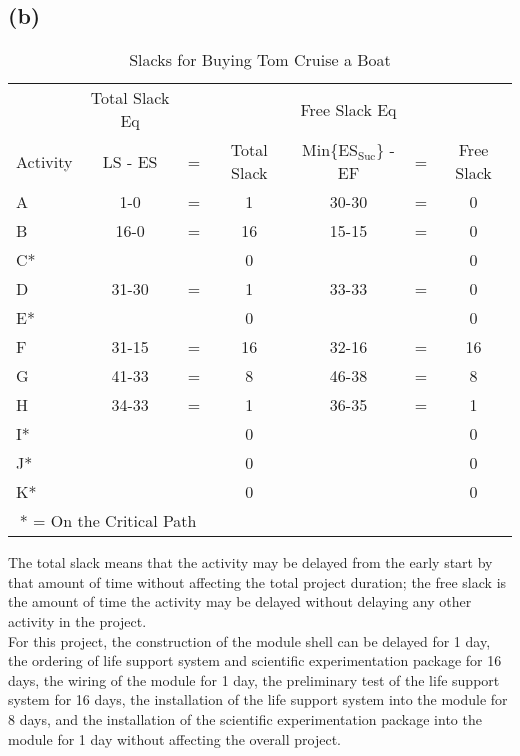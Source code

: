 \documentclass{article}
\begin{document}
	\subsection*{(b)}
		{\renewcommand{\arraystretch}{1.2} 
	\begin{table}[h!tbp]
  		\begin{center}
    		\caption{Slacks for Buying Tom Cruise a Boat}
    		\label{tab:table2}
			
    		\begin{tabular}{lcccccc}
				 & Total Slack Eq &  &  & Free Slack Eq & &\\
				Activity & LS - ES & = & Total Slack & Min\{ES$_{\text{Suc}}$\} - EF &= & Free Slack \\
				\hline
      			A  & 1-0   & = & 1  & 30-30 & = & 0 \\
      			B  & 16-0  & = & 16 & 15-15 & = & 0 \\
				C* &       &   & 0  &       &   & 0 \\
				D  & 31-30 & = & 1  & 33-33 & = & 0 \\
				E* &       &   & 0  &       &   & 0 \\
				F  & 31-15 & = & 16 & 32-16 & = & 16\\
				G  & 41-33 & = & 8  & 46-38 & = & 8 \\
				H  & 34-33 & = & 1  & 36-35 & = & 1 \\
				I* &       &   & 0  &       &   & 0 \\
				J* &       &   & 0  &       &   & 0 \\
				K* &       &   & 0  &       &   & 0 \\
				\hline
				\multicolumn{3}{c}{* = On the Critical Path}\\
    		\end{tabular}
  		\end{center}
	\end{table}
	}
	\noindent The total slack means that the activity may be delayed from the early start by that amount of time without affecting the total project duration; the free slack is the amount of time the activity may be delayed without delaying any other activity in the project.\\
	For this project, the construction of the module shell can be delayed for 1 day, the ordering of life support system and scientific experimentation package for 16 days, the wiring of the module for 1 day, the preliminary test of the life support system for 16 days, the installation of the life support system into the module for 8 days, and the installation of the scientific experimentation package into the module for 1 day without affecting the overall project.\\
\end{document}
